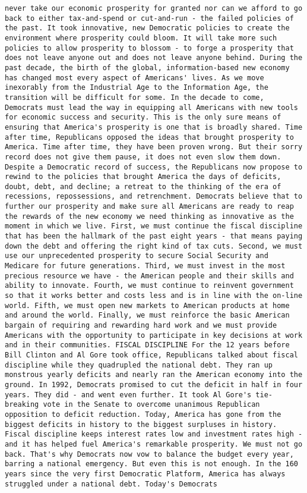 \documentclass[
]{article}
\begin{document}
\begin{verbatim}
never take our economic prosperity for granted nor can we afford to go back to either tax-and-spend or cut-and-run - the failed policies of the past. It took innovative, new Democratic policies to create the environment where prosperity could bloom. It will take more such policies to allow prosperity to blossom - to forge a prosperity that does not leave anyone out and does not leave anyone behind. During the past decade, the birth of the global, information-based new economy has changed most every aspect of Americans' lives. As we move inexorably from the Industrial Age to the Information Age, the transition will be difficult for some. In the decade to come, Democrats must lead the way in equipping all Americans with new tools for economic success and security. This is the only sure means of ensuring that America's prosperity is one that is broadly shared. Time after time, Republicans opposed the ideas that brought prosperity to America. Time after time, they have been proven wrong. But their sorry record does not give them pause, it does not even slow them down. Despite a Democratic record of success, the Republicans now propose to rewind to the policies that brought America the days of deficits, doubt, debt, and decline; a retreat to the thinking of the era of recessions, repossessions, and retrenchment. Democrats believe that to further our prosperity and make sure all Americans are ready to reap the rewards of the new economy we need thinking as innovative as the moment in which we live. First, we must continue the fiscal discipline that has been the hallmark of the past eight years - that means paying down the debt and offering the right kind of tax cuts. Second, we must use our unprecedented prosperity to secure Social Security and Medicare for future generations. Third, we must invest in the most precious resource we have - the American people and their skills and ability to innovate. Fourth, we must continue to reinvent government so that it works better and costs less and is in line with the on-line world. Fifth, we must open new markets to American products at home and around the world. Finally, we must reinforce the basic American bargain of requiring and rewarding hard work and we must provide Americans with the opportunity to participate in key decisions at work and in their communities. FISCAL DISCIPLINE For the 12 years before Bill Clinton and Al Gore took office, Republicans talked about fiscal discipline while they quadrupled the national debt. They ran up monstrous yearly deficits and nearly ran the American economy into the ground. In 1992, Democrats promised to cut the deficit in half in four years. They did - and went even further. It took Al Gore's tie-breaking vote in the Senate to overcome unanimous Republican opposition to deficit reduction. Today, America has gone from the biggest deficits in history to the biggest surpluses in history. Fiscal discipline keeps interest rates low and investment rates high - and it has helped fuel America's remarkable prosperity. We must not go back. That's why Democrats now vow to balance the budget every year, barring a national emergency. But even this is not enough. In the 160 years since the very first Democratic Platform, America has always struggled under a national debt. Today's Democrats 
\end{verbatim}
\end{document}
